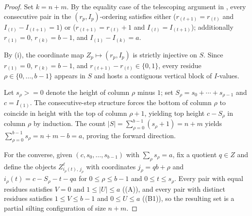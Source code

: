 \documentclass[11pt, a4paper]{article}
\theoremstyle{definition}
\def\ge{>=}%
\def\mathbb#1{#1}%
\begin{document}
\begin{proof}
Set $k = n+m$. By the equality case of the telescoping argument in , every consecutive pair in the $(r_p, I_p)$-ordering satisfies either ($r_{(t+1)} = r_{(t)}$ and $I_{(t)} - I_{(t+1)} = 1$) or ($r_{(t+1)} = r_{(t)} + 1$ and $I_{(t)} = I_{(t+1)}$); additionally $r_{(1)} = 0$, $r_{(k)} = b-1$, and $I_{(1)} - I_{(k)} = a$.

By \textup{(i)}, the coordinate map $Z_p \mapsto (r_p, I_p)$ is strictly injective on $S$. Since $r_{(1)} = 0$, $r_{(k)} = b-1$, and $r_{(t+1)} - r_{(t)} \in \{0,1\}$, every residue $\rho \in \{0, \ldots, b-1\}$ appears in $S$ and hosts a contiguous vertical block of $I$-values.

Let $s_\rho \ge 0$ denote the height of column $\rho$ minus $1$; set $S_\rho = s_0 + \cdots + s_{\rho-1}$ and $c = I_{(1)}$. The consecutive-step structure forces the bottom of column $\rho$ to coincide in height with the top of column $\rho+1$, yielding top height $c - S_\rho$ in column $\rho$ by induction. The count $|S| = \sum_{\rho=0}^{b-1} (s_\rho + 1) = n+m$ yields $\sum_{\rho=0}^{b-1} s_\rho = n+m - b = a$, proving the forward direction.

For the converse, given $(c, s_0, \ldots, s_{b-1})$ with $\sum_\rho s_\rho = a$, fix a quotient $q \in \mathbb Z$ and define the objects $Z_{i_\rho(t), \, j_\rho}^\ell$ with coordinates $j_\rho = qb + \rho$ and $i_\rho(t) = c - S_\rho - t - qa$ for $0 \le \rho \le b-1$ and $0 \le t \le s_\rho$. Every pair with equal residues satisfies $V = 0$ and $1 \le |U| \le a$ (\textup{(A)}), and every pair with distinct residues satisfies $1 \le V \le b-1$ and $0 \le U \le a$ (\textup{(B1)}), so the resulting set is a partial silting configuration of size $n+m$.
\end{proof}
\end{document}
